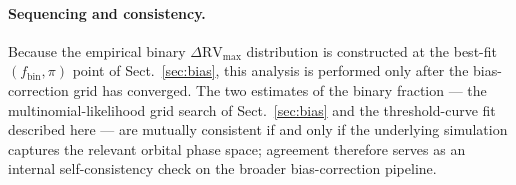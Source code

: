 \paragraph{Sequencing and consistency.}
Because the empirical binary $\Delta\mathrm{RV}_{\max}$ distribution is
constructed at the best-fit $(f_\mathrm{bin}, \pi)$ point of
Sect.~\ref{sec:bias}, this analysis is performed only after the
bias-correction grid has converged. The two estimates of the binary
fraction --- the multinomial-likelihood grid search of
Sect.~\ref{sec:bias} and the threshold-curve fit described here ---
are mutually consistent if and only if the underlying simulation
captures the relevant orbital phase space; agreement therefore serves
as an internal self-consistency check on the broader bias-correction
pipeline.

